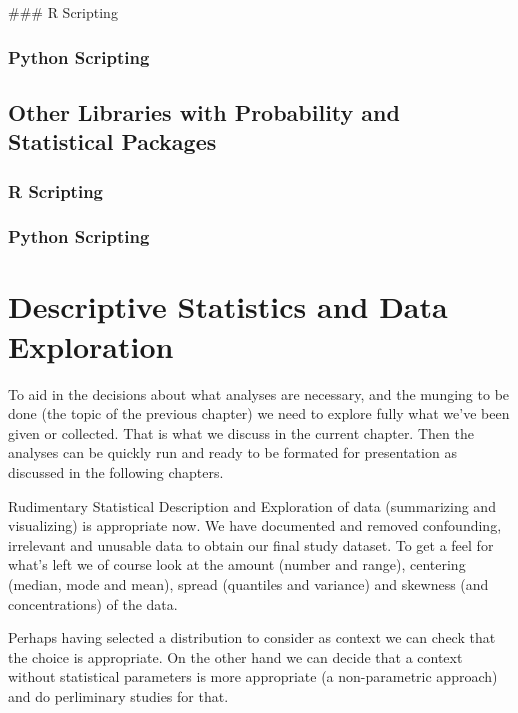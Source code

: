 \documentclass[]{book}
\theoremstyle{definition}
\theoremstyle{definition}
\theoremstyle{definition}
\theoremstyle{remark}
\begin{document}
 \#\#\# R Scripting

\subsection{Python Scripting}\label{python-scripting-6}

\section{Other Libraries with Probability and Statistical
Packages}\label{other-libraries-with-probability-and-statistical-packages}

\subsection{R Scripting}\label{r-scripting-6}

\subsection{Python Scripting}\label{python-scripting-7}

\chapter{Descriptive Statistics and Data
Exploration}\label{descriptive-statistics-and-data-exploration}

To aid in the decisions about what analyses are necessary, and the
munging to be done (the topic of the previous chapter) we need to
explore fully what we've been given or collected. That is what we
discuss in the current chapter. Then the analyses can be quickly run and
ready to be formated for presentation as discussed in the following
chapters.

 Rudimentary Statistical Description and
Exploration of data (summarizing and visualizing) is appropriate now. We
have documented and removed confounding, irrelevant and unusable data to
obtain our final study dataset. To get a feel for what's left we of
course look at the amount (number and range), centering (median, mode
and mean), spread (quantiles and variance) and skewness (and
concentrations) of the data.

Perhaps having selected a distribution to consider as context we can
check that the choice is appropriate. On the other hand we can decide
that a context without statistical parameters is more appropriate (a
non-parametric approach) and do perliminary studies for that.
\end{document}
